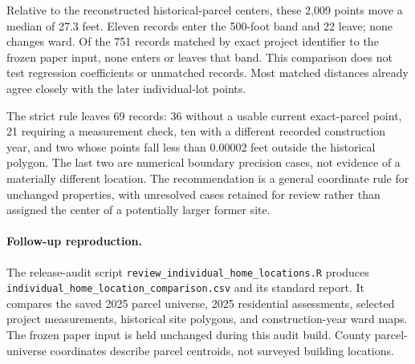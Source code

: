 Relative to the reconstructed historical-parcel centers, these 2,009 points move a median of 27.3 feet. Eleven records enter the 500-foot band and 22 leave; none changes ward. Of the 751 records matched by exact project identifier to the frozen paper input, none enters or leaves that band. This comparison does not test regression coefficients or unmatched records. Most matched distances already agree closely with the later individual-lot points.

The strict rule leaves 69 records: 36 without a usable current exact-parcel point, 21 requiring a measurement check, ten with a different recorded construction year, and two whose points fall less than 0.00002 feet outside the historical polygon. The last two are numerical boundary precision cases, not evidence of a materially different location. The recommendation is a general coordinate rule for unchanged properties, with unresolved cases retained for review rather than assigned the center of a potentially larger former site.

\paragraph{Follow-up reproduction.} The release-audit script \texttt{review\_individual\_home\_locations.R} produces \texttt{individual\_home\_location\_comparison.csv} and its standard report. It compares the saved 2025 parcel universe, 2025 residential assessments, selected project measurements, historical site polygons, and construction-year ward maps. The frozen paper input is held unchanged during this audit build. County parcel-universe coordinates describe parcel centroids, not surveyed building locations.
